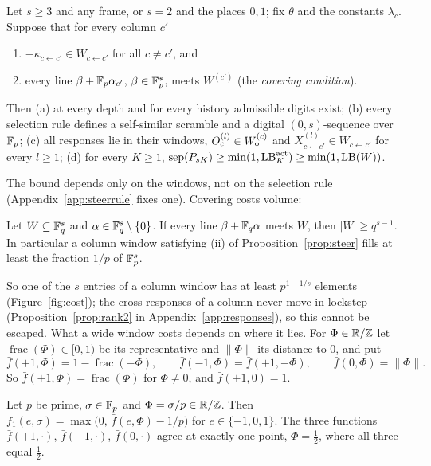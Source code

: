 \begin{proposition}\label{prop:steer}
Let $s\ge3$ and any frame, or $s=2$ and the places $0,1$; fix $\theta$ and the constants $\lambda_c$. Suppose that for every column $c'$
\begin{enumerate}
\item[(i)] $-\kappa_{c\leftarrow c'}\in W_{c\leftarrow c'}$ for all $c\ne c'$, and
\item[(ii)] every line $\beta+\mathbb{F}_p\alpha_{c'}$, $\beta\in\mathbb{F}_p^s$, meets $W^{(c')}$ (the \emph{covering condition}).
\end{enumerate}
Then (a) at every depth and for every history admissible digits exist; (b) every selection rule defines a self-similar scramble and a digital $(0,s)$-sequence over $\mathbb{F}_p$; (c) all responses lie in their windows, $O^{(l)}_c\in W_{\mathrm o}^{(c)}$ and $X^{(l)}_{c\leftarrow c'}\in W_{c\leftarrow c'}$ for every $l\ge1$; (d) for every $K\ge1$, $\operatorname{sep}(P_{sK})\ge\min(1,\mathrm{LB}^{\mathrm{act}}_K)\ge\min(1,\mathrm{LB}(W))$.
\end{proposition}

The bound depends only on the windows, not on the selection rule (Appendix~\ref{app:steerrule} fixes one). Covering costs volume:

\begin{lemma}\label{lem:volume}
Let $W\subseteq\mathbb{F}_q^s$ and $\alpha\in\mathbb{F}_q^s\setminus\{0\}$. If every line $\beta+\mathbb{F}_q\alpha$ meets $W$, then $|W|\ge q^{s-1}$. In particular a column window satisfying (ii) of Proposition~\ref{prop:steer} fills at least the fraction $1/p$ of $\mathbb{F}_p^s$.
\end{lemma}

So one of the $s$ entries of a column window has at least $p^{1-1/s}$ elements (Figure~\ref{fig:cost}); the cross responses of a column never move in lockstep (Proposition~\ref{prop:rank2} in Appendix~\ref{app:responses}), so this cannot be escaped. What a wide window costs depends on where it lies. For $\Phi\in\mathbb{R}/\mathbb{Z}$ let $\operatorname{frac}(\Phi)\in[0,1)$ be its representative and $\|\Phi\|$ its distance to $0$, and put
\[
\bar f(+1,\Phi)=1-\operatorname{frac}(-\Phi),\qquad \bar f(-1,\Phi)=\bar f(+1,-\Phi),\qquad \bar f(0,\Phi)=\|\Phi\| .
\]
So $\bar f(+1,\Phi)=\operatorname{frac}(\Phi)$ for $\Phi\ne0$, and $\bar f(\pm1,0)=1$.

\begin{lemma}\label{lem:antipode}
Let $p$ be prime, $\sigma\in\mathbb{F}_p$ and $\Phi=\sigma/p\in\mathbb{R}/\mathbb{Z}$. Then $f_1(e,\sigma)=\max\bigl(0,\,\bar f(e,\Phi)-1/p\bigr)$ for $e\in\{-1,0,1\}$. The three functions $\bar f(+1,\cdot)$, $\bar f(-1,\cdot)$, $\bar f(0,\cdot)$ agree at exactly one point, $\Phi=\frac12$, where all three equal $\frac12$.
\end{lemma}


